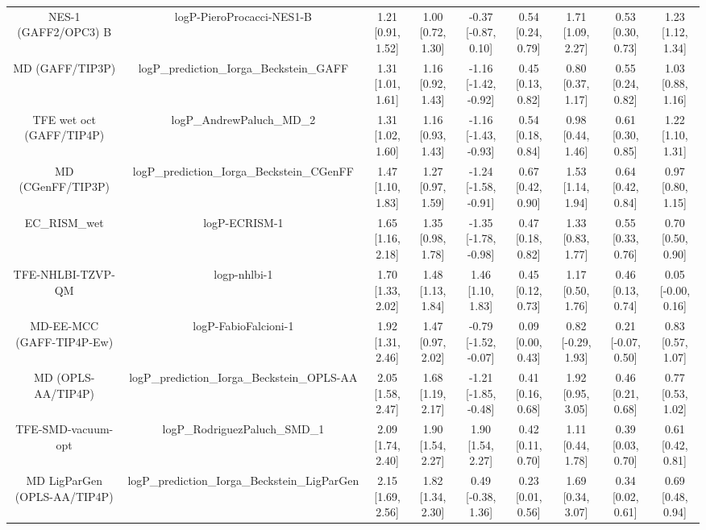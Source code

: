 \documentclass{article}
\begin{document}
\begin{center}
\begin{longtable}{|ccccccccc|}
        NES-1 (GAFF2/OPC3) B &                     logP-PieroProcacci-NES1-B & 1.21 [0.91, 1.52] & 1.00 [0.72, 1.30] &  -0.37 [-0.87, 0.10] & 0.54 [0.24, 0.79] &    1.71 [1.09, 2.27] &    0.53 [0.30, 0.73] &    1.23 [1.12, 1.34] \\
             MD (GAFF/TIP3P) &      logP\_prediction\_Iorga\_Beckstein\_GAFF & 1.31 [1.01, 1.61] & 1.16 [0.92, 1.43] & -1.16 [-1.42, -0.92] & 0.45 [0.13, 0.82] &    0.80 [0.37, 1.17] &    0.55 [0.24, 0.82] &    1.03 [0.88, 1.16] \\
    TFE wet oct (GAFF/TIP4P) &                     logP\_AndrewPaluch\_MD\_2 & 1.31 [1.02, 1.60] & 1.16 [0.93, 1.43] & -1.16 [-1.43, -0.93] & 0.54 [0.18, 0.84] &    0.98 [0.44, 1.46] &    0.61 [0.30, 0.85] &    1.22 [1.10, 1.31] \\
           MD (CGenFF/TIP3P) &    logP\_prediction\_Iorga\_Beckstein\_CGenFF & 1.47 [1.10, 1.83] & 1.27 [0.97, 1.59] & -1.24 [-1.58, -0.91] & 0.67 [0.42, 0.90] &    1.53 [1.14, 1.94] &    0.64 [0.42, 0.84] &    0.97 [0.80, 1.15] \\
                 EC_RISM_wet &                                 logP-ECRISM-1 & 1.65 [1.16, 2.18] & 1.35 [0.98, 1.78] & -1.35 [-1.78, -0.98] & 0.47 [0.18, 0.82] &    1.33 [0.83, 1.77] &    0.55 [0.33, 0.76] &    0.70 [0.50, 0.90] \\
           TFE-NHLBI-TZVP-QM &                                  logp-nhlbi-1 & 1.70 [1.33, 2.02] & 1.48 [1.13, 1.84] &    1.46 [1.10, 1.83] & 0.45 [0.12, 0.73] &    1.17 [0.50, 1.76] &    0.46 [0.13, 0.74] &   0.05 [-0.00, 0.16] \\
   MD-EE-MCC (GAFF-TIP4P-Ew) &                          logP-FabioFalcioni-1 & 1.92 [1.31, 2.46] & 1.47 [0.97, 2.02] & -0.79 [-1.52, -0.07] & 0.09 [0.00, 0.43] &   0.82 [-0.29, 1.93] &   0.21 [-0.07, 0.50] &    0.83 [0.57, 1.07] \\
          MD (OPLS-AA/TIP4P) &   logP\_prediction\_Iorga\_Beckstein\_OPLS-AA & 2.05 [1.58, 2.47] & 1.68 [1.19, 2.17] & -1.21 [-1.85, -0.48] & 0.41 [0.16, 0.68] &    1.92 [0.95, 3.05] &    0.46 [0.21, 0.68] &    0.77 [0.53, 1.02] \\
          TFE-SMD-vacuum-opt &                 logP\_RodriguezPaluch\_SMD\_1 & 2.09 [1.74, 2.40] & 1.90 [1.54, 2.27] &    1.90 [1.54, 2.27] & 0.42 [0.11, 0.70] &    1.11 [0.44, 1.78] &    0.39 [0.03, 0.70] &    0.61 [0.42, 0.81] \\
MD LigParGen (OPLS-AA/TIP4P) & logP\_prediction\_Iorga\_Beckstein\_LigParGen & 2.15 [1.69, 2.56] & 1.82 [1.34, 2.30] &   0.49 [-0.38, 1.36] & 0.23 [0.01, 0.56] &    1.69 [0.34, 3.07] &    0.34 [0.02, 0.61] &    0.69 [0.48, 0.94] \\

\end{longtable}
\end{center}
\end{document}
